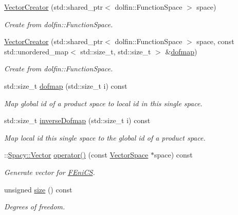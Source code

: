 \begin{DoxyCompactItemize}
\item 
\hyperlink{classSpacy_1_1FEniCS_1_1VectorCreator_aadf9d699ede2e83816411523175248d8}{\-Vector\-Creator} (std\-::shared\-\_\-ptr$<$ dolfin\-::\-Function\-Space $>$ space)
\begin{DoxyCompactList}\small\item\em \-Create from dolfin\-::\-Function\-Space. \end{DoxyCompactList}\item 
\hyperlink{classSpacy_1_1FEniCS_1_1VectorCreator_a642f907081ec0796b871a5e290b9679d}{\-Vector\-Creator} (std\-::shared\-\_\-ptr$<$ dolfin\-::\-Function\-Space $>$ space, const std\-::unordered\-\_\-map$<$ std\-::size\-\_\-t, std\-::size\-\_\-t $>$ \&\hyperlink{classSpacy_1_1FEniCS_1_1VectorCreator_ad41a34e44494e8d166f9890a8877f994}{dofmap})
\begin{DoxyCompactList}\small\item\em \-Create from dolfin\-::\-Function\-Space. \end{DoxyCompactList}\item 
std\-::size\-\_\-t \hyperlink{classSpacy_1_1FEniCS_1_1VectorCreator_ad41a34e44494e8d166f9890a8877f994}{dofmap} (std\-::size\-\_\-t i) const 
\begin{DoxyCompactList}\small\item\em \-Map global id of a product space to local id in this single space. \end{DoxyCompactList}\item 
std\-::size\-\_\-t \hyperlink{classSpacy_1_1FEniCS_1_1VectorCreator_a8e369dcbb722462ee0bca008eae6b2f3}{inverse\-Dofmap} (std\-::size\-\_\-t i) const 
\begin{DoxyCompactList}\small\item\em \-Map local id this single space to the global id of a product space. \end{DoxyCompactList}\item 
\-::\hyperlink{classSpacy_1_1Vector}{\-Spacy\-::\-Vector} \hyperlink{classSpacy_1_1FEniCS_1_1VectorCreator_ab5121de05ec984b99febef9e839068dc}{operator()} (const \hyperlink{classSpacy_1_1VectorSpace}{\-Vector\-Space} $\ast$space) const 
\begin{DoxyCompactList}\small\item\em \-Generate vector for \hyperlink{namespaceSpacy_1_1FEniCS}{\-F\-Eni\-C\-S}. \end{DoxyCompactList}\item 
\hypertarget{classSpacy_1_1FEniCS_1_1VectorCreator_afb8357f953730e792e18e8bc16a585b4}{unsigned \hyperlink{classSpacy_1_1FEniCS_1_1VectorCreator_afb8357f953730e792e18e8bc16a585b4}{size} () const }\label{classSpacy_1_1FEniCS_1_1VectorCreator_afb8357f953730e792e18e8bc16a585b4}

\begin{DoxyCompactList}\small\item\em \-Degrees of freedom. \end{DoxyCompactList}\end{DoxyCompactItemize}


